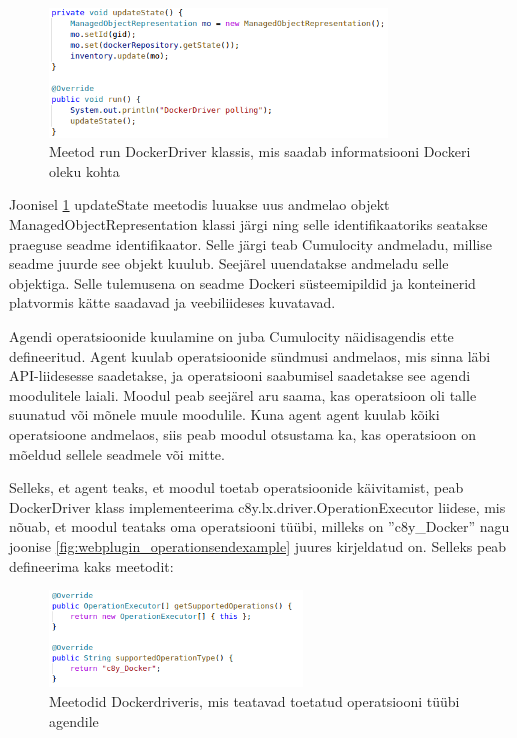 \documentclass[12pt]{article}
\begin{document}
 \begin{figure} [ht] %
 \begin{center}
 \includegraphics[width=0.8\textwidth]{dockerdriver_run}
 \caption{Meetod run DockerDriver klassis, mis saadab informatsiooni Dockeri oleku kohta}
 \label{fig:dockerdriver_run}
 \end{center}
 \end{figure}
 
 \FloatBarrier

 Joonisel \ref{fig:dockerdriver_run} updateState meetodis luuakse uus andmelao objekt
 ManagedObjectRepresentation klassi järgi ning selle identifikaatoriks seatakse
 praeguse seadme identifikaator. Selle järgi teab Cumulocity andmeladu, millise
 seadme juurde see objekt kuulub. Seejärel uuendatakse andmeladu selle objektiga.
 Selle tulemusena on seadme Dockeri süsteemipildid ja konteinerid platvormis kätte
 saadavad ja veebiliideses kuvatavad.

 Agendi operatsioonide kuulamine on juba Cumulocity näidisagendis ette defineeritud.
 Agent kuulab operatsioonide sündmusi andmelaos, mis sinna läbi API-liidesesse
 saadetakse, ja operatsiooni
 saabumisel saadetakse see agendi moodulitele laiali. Moodul peab seejärel aru
 saama, kas operatsioon oli talle suunatud või mõnele muule moodulile. Kuna agent
 agent kuulab kõiki operatsioone andmelaos, siis peab moodul otsustama ka,
 kas operatsioon on mõeldud sellele seadmele või mitte.

 Selleks, et agent teaks, et moodul toetab operatsioonide käivitamist, peab
 DockerDriver klass implementeerima c8y.lx.driver.OperationExecutor
 liidese, mis nõuab, et moodul teataks oma operatsiooni tüübi,
 milleks on ''c8y\_Docker'' nagu joonise
 \ref{fig:webplugin_operationsendexample} juures kirjeldatud on. Selleks peab
 defineerima kaks meetodit:

 \begin{figure} [ht] %
 \begin{center}
 \includegraphics[width=0.6\textwidth]{dockerdriver_supportedoperationtype}
 \caption{Meetodid Dockerdriveris, mis teatavad toetatud operatsiooni tüübi agendile}
 \label{fig:dockerdriver_supportedoperationtype}
 \end{center}
 \end{figure}
 
\end{document}
